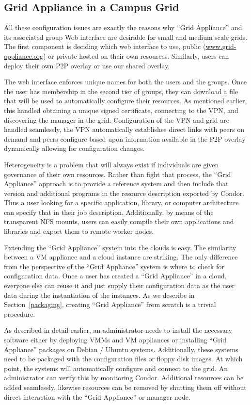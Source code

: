 \documentclass[twocolumn]{svjour3}
\begin{document}
\subsection{Grid Appliance in a Campus Grid}

All these configuration issues are exactly the reasons why ``Grid Appliance''
and its associated group Web interface are desirable for small and medium scale
grids.  The first component is deciding which web interface to use, public
(\url{www.grid-appliance.org}) or private hosted on their own resources.
Similarly, users can deploy their own P2P overlay or use our shared overlay.

The web interface enforces unique names for both the users and the groups.
Once the user has membership in the second tier of groups, they can download a
file that will be used to automatically configure their resources.  As
mentioned earlier, this handled obtaining a unique signed certificate,
connecting to the VPN, and discovering the manager in the grid.  Configuration
of the VPN and grid are handled seamlessly, the VPN automatically establishes
direct links with peers on demand and peers configure based upon information
available in the P2P overlay dynamically allowing for configuration changes.

Heterogeneity is a problem that will always exist if individuals are given
governance of their own resources.  Rather than fight that process, the ``Grid
Appliance'' approach is to provide a reference system and then include that
version and additional programs in the resource description exported by Condor.
Thus a user looking for a specific application, library, or computer
architecture can specify that in their job description.  Additionally, by means
of the transparent NFS mounts, users can easily compile their own applications
and libraries and export them to remote worker nodes.

Extending the ``Grid Appliance'' system into the clouds is easy.  The
similarity between a VM appliance and a cloud instance are striking.  The only
difference from the perspective of the ``Grid Appliance'' system is where to
check for configuration data.  Once a user has created a ``Grid Appliance'' in
a cloud, everyone else can reuse it and just supply their configuration data as
the user data during the instantiation of the instances.  As we describe in
Section~\ref{packaging}, creating ``Grid Appliance'' from scratch is a trivial
procedure.

As described in detail earlier, an administrator needs to install the necessary
software either by deploying VMMs and VM appliances or installing ``Grid
Appliance'' packages on Debian / Ubuntu systems.  Additionally, these systems
need to be packaged with the configuration files or floppy disk images.  At
which point, the systems will automatically configure and connect to the grid.
An administrator can verify this by monitoring Condor.  Additional resources
can be added seamlessly, likewise resources can be removed by shutting them off
without direct interaction with the ``Grid Appliance'' or manager node.
\end{document}
